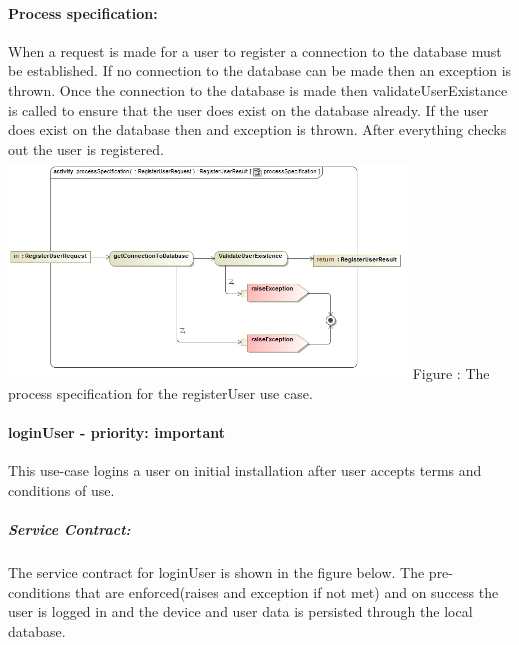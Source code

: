 \documentclass[hidelinks, 12pt, oneside]{article}
\begin{document}
		\paragraph{Process specification:}		
		When a request is made for a user to register a connection to the database must be established. If no connection to the database can be made then an exception is thrown. Once the connection to the database is made then validateUserExistance is called to ensure that the user does exist on the database already. If the user does exist on the database then and exception is thrown. After everything checks out the user is registered.\newline\newline	
		\includegraphics[width=400px,height=220px]{img/processSpecificationRegisterUser.jpg}
		Figure : The process specification for the registerUser use case.		
	
	\paragraph{loginUser - priority: important}
		This use-case logins a user on initial installation after user accepts terms and conditions of use.
	\subparagraph{Service Contract:}
		The service contract for loginUser is shown in the figure below. The pre-conditions that are enforced(raises and exception if not met) and on success the user is logged in and the device and user data is persisted through the local database.\newline 	
	
\end{document}
